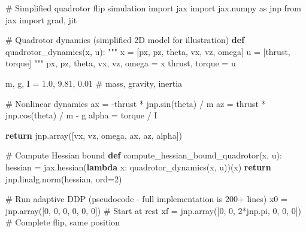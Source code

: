 \documentclass[
  letterpaper,
  DIV=11,
  numbers=noendperiod]{scrartcl}
\newenvironment{Shaded}{\begin{snugshade}}{\end{snugshade}}
\newcommand{\BuiltInTok}[1]{\textcolor[rgb]{0.00,0.23,0.31}{#1}}
\newcommand{\CommentTok}[1]{\textcolor[rgb]{0.37,0.37,0.37}{#1}}
\newcommand{\ControlFlowTok}[1]{\textcolor[rgb]{0.00,0.23,0.31}{\textbf{#1}}}
\newcommand{\DecValTok}[1]{\textcolor[rgb]{0.68,0.00,0.00}{#1}}
\newcommand{\FloatTok}[1]{\textcolor[rgb]{0.68,0.00,0.00}{#1}}
\newcommand{\ImportTok}[1]{\textcolor[rgb]{0.00,0.46,0.62}{#1}}
\newcommand{\KeywordTok}[1]{\textcolor[rgb]{0.00,0.23,0.31}{\textbf{#1}}}
\newcommand{\NormalTok}[1]{\textcolor[rgb]{0.00,0.23,0.31}{#1}}
\newcommand{\OperatorTok}[1]{\textcolor[rgb]{0.37,0.37,0.37}{#1}}
\begin{document}
\begin{Shaded}
\begin{Highlighting}[]
\CommentTok{\# Simplified quadrotor flip simulation}
\ImportTok{import}\NormalTok{ jax}
\ImportTok{import}\NormalTok{ jax.numpy }\ImportTok{as}\NormalTok{ jnp}
\ImportTok{from}\NormalTok{ jax }\ImportTok{import}\NormalTok{ grad, jit}

\CommentTok{\# Quadrotor dynamics (simplified 2D model for illustration)}
\KeywordTok{def}\NormalTok{ quadrotor\_dynamics(x, u):}
    \CommentTok{"""}
\CommentTok{    x = [px, pz, theta, vx, vz, omega]}
\CommentTok{    u = [thrust, torque]}
\CommentTok{    """}
\NormalTok{    px, pz, theta, vx, vz, omega }\OperatorTok{=}\NormalTok{ x}
\NormalTok{    thrust, torque }\OperatorTok{=}\NormalTok{ u}

\NormalTok{    m, g, I }\OperatorTok{=} \FloatTok{1.0}\NormalTok{, }\FloatTok{9.81}\NormalTok{, }\FloatTok{0.01}  \CommentTok{\# mass, gravity, inertia}

    \CommentTok{\# Nonlinear dynamics}
\NormalTok{    ax }\OperatorTok{=} \OperatorTok{{-}}\NormalTok{thrust }\OperatorTok{*}\NormalTok{ jnp.sin(theta) }\OperatorTok{/}\NormalTok{ m}
\NormalTok{    az }\OperatorTok{=}\NormalTok{ thrust }\OperatorTok{*}\NormalTok{ jnp.cos(theta) }\OperatorTok{/}\NormalTok{ m }\OperatorTok{{-}}\NormalTok{ g}
\NormalTok{    alpha }\OperatorTok{=}\NormalTok{ torque }\OperatorTok{/}\NormalTok{ I}

    \ControlFlowTok{return}\NormalTok{ jnp.array([vx, vz, omega, ax, az, alpha])}

\CommentTok{\# Compute Hessian bound}
\KeywordTok{def}\NormalTok{ compute\_hessian\_bound\_quadrotor(x, u):}
\NormalTok{    hessian }\OperatorTok{=}\NormalTok{ jax.hessian(}\KeywordTok{lambda}\NormalTok{ x: quadrotor\_dynamics(x, u))(x)}
    \ControlFlowTok{return}\NormalTok{ jnp.linalg.norm(hessian, }\BuiltInTok{ord}\OperatorTok{=}\DecValTok{2}\NormalTok{)}

\CommentTok{\# Run adaptive DDP (pseudocode {-} full implementation is 200+ lines)}
\NormalTok{x0 }\OperatorTok{=}\NormalTok{ jnp.array([}\DecValTok{0}\NormalTok{, }\DecValTok{0}\NormalTok{, }\DecValTok{0}\NormalTok{, }\DecValTok{0}\NormalTok{, }\DecValTok{0}\NormalTok{, }\DecValTok{0}\NormalTok{])  }\CommentTok{\# Start at rest}
\NormalTok{xf }\OperatorTok{=}\NormalTok{ jnp.array([}\DecValTok{0}\NormalTok{, }\DecValTok{0}\NormalTok{, }\DecValTok{2}\OperatorTok{*}\NormalTok{jnp.pi, }\DecValTok{0}\NormalTok{, }\DecValTok{0}\NormalTok{, }\DecValTok{0}\NormalTok{])  }\CommentTok{\# Complete flip, same position}


\end{Highlighting}
\end{Shaded}
\end{document}
